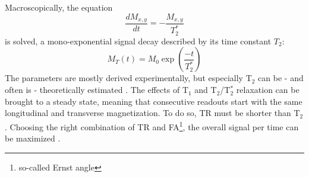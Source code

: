         Macroscopically, the equation
        \begin{equation}
        \frac{dM_{x,y}}{dt} = - \frac{M_{x,y}}{T_2^*}
        \end{equation}
        is solved, a mono-exponential signal decay described by its time constant $T_2$:
        \begin{equation}
            M_T(t) = M_0\exp{\left(\frac{-t}{T_2^*}\right)}
        \end{equation}
        The parameters are mostly derived experimentally, but especially T$_2$ can be - and often is - theoretically estimated \cite{kaupp_calculation_2003}.
        The effects of T$_1$ and T$_2$/T$_2^*$ relaxation can be brought to a steady state, meaning that consecutive readouts start with the same longitudinal and transverse magnetization. To do so, TR must be shorter than $\mathrm{T}_2$. Choosing the right combination of TR and FA\footnote[1]{so-called Ernst angle}, the overall signal per time can be maximized \cite{nitz_contrast_1999}.
